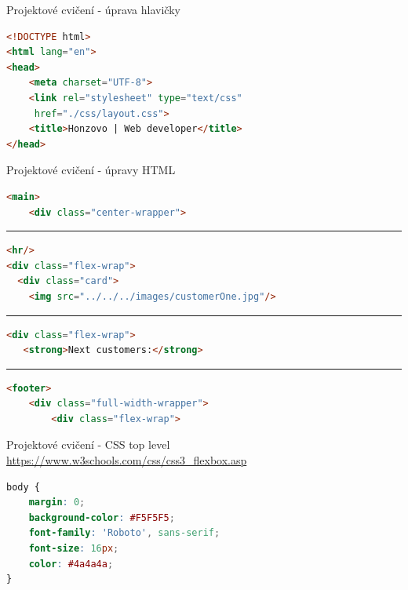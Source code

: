 \documentclass{beamer}
\begin{document}
\begin{frame}[fragile, shrink=0]{Projektové cvičení - úprava hlavičky}

\begin{lstlisting}[language=HTML]
<!DOCTYPE html>
<html lang="en">
<head>
    <meta charset="UTF-8">
    <link rel="stylesheet" type="text/css" 
     href="./css/layout.css">
    <title>Honzovo | Web developer</title>
</head>
\end{lstlisting}
	
\end{frame}


\begin{frame}[fragile, shrink=0]{Projektové cvičení - úpravy HTML}

\begin{lstlisting}[language=HTML]
<main>
    <div class="center-wrapper">
\end{lstlisting}
	
\noindent\rule{\textwidth}{1pt}


\begin{lstlisting}[language=HTML]
<hr/>
<div class="flex-wrap">
  <div class="card">
    <img src="../../../images/customerOne.jpg"/>
\end{lstlisting}

\noindent\rule{\textwidth}{1pt}

\begin{lstlisting}[language=HTML]
<div class="flex-wrap">
   <strong>Next customers:</strong>
\end{lstlisting}

\noindent\rule{\textwidth}{1pt}

\begin{lstlisting}[language=HTML]
<footer>
    <div class="full-width-wrapper">
        <div class="flex-wrap">
\end{lstlisting}
	
\end{frame}

\begin{frame}[fragile, shrink=0]{Projektové cvičení - CSS top level}
\url{https://www.w3schools.com/css/css3_flexbox.asp}
\begin{lstlisting}[language=CSS]
body {
    margin: 0;
    background-color: #F5F5F5;
    font-family: 'Roboto', sans-serif;
    font-size: 16px;
    color: #4a4a4a;
}

\end{lstlisting}
	
\end{frame}
\end{document}
